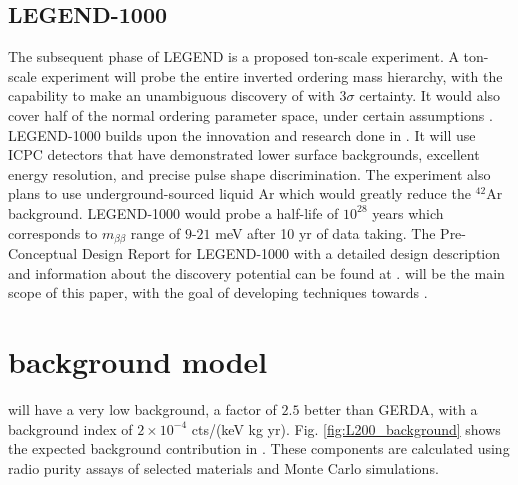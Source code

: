 \subsection{LEGEND-1000}
The subsequent phase of LEGEND is a proposed ton-scale experiment. A ton-scale experiment will probe the entire inverted ordering mass hierarchy, with the capability to make an unambiguous discovery of {\onbb} with $3\sigma$ certainty. It would also cover half of the normal ordering parameter space, under certain assumptions \cite{l1000_pcdr}. LEGEND-1000 builds upon the innovation and research done in {\Ltwo}. It will use ICPC detectors that have demonstrated lower surface backgrounds, excellent energy resolution, and precise pulse shape discrimination. The experiment also plans to use underground-sourced liquid Ar which would greatly reduce the $^{42}$Ar background. LEGEND-1000 would probe a half-life of $10^{28}$ years which corresponds to $m_{\beta\beta}$ range of $9$-$21$ meV after 10 yr of data taking. The Pre-Conceptual Design Report for LEGEND-1000 with a detailed design description and information about the discovery potential can be found at \cite{l1000_pcdr}. {\Ltwo} will be the main scope of this paper, with the goal of developing techniques towards {\Lthou}.




\section{{\Ltwo} background model}

{\Ltwo} will have a very low background, a factor of $2.5$ better than GERDA, with a background index of $2 \times 10^{-4}$ cts/(keV kg yr). Fig. \ref{fig:L200_background} shows the expected background contribution in {\Ltwo}. These components are calculated using radio purity assays of selected materials and Monte Carlo simulations. 

